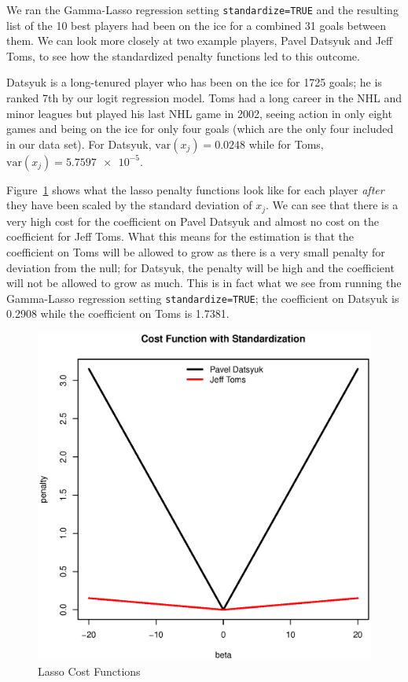 \documentclass[11pt, fleqn]{article}
\begin{document}
We ran the Gamma-Lasso regression setting \texttt{standardize=TRUE} and the resulting list of the 10 best players had been on the ice for a combined 31 goals between them. We can look more closely at two example players, Pavel Datsyuk and Jeff Toms, to see how the standardized penalty functions led to this outcome.

Datsyuk is a long-tenured player who has been on the ice for 1725 goals; he is ranked 7th by our logit regression model. Toms had a long career in the NHL and minor leagues but played his last NHL game in 2002, seeing action in only eight games and being on the ice for only four goals (which are the only four included in our data set). For Datsyuk, $\mathrm{var}(x_j)=0.0248$ while for Toms, $\mathrm{var}(x_j)=\num{5.7597e-5}$.

Figure~\ref{fig:cost_fcn} shows what the lasso penalty functions look like for each player \textit{after} they have been scaled by the standard deviation of $x_j$. We can see that there is a very high cost for the coefficient on Pavel Datsyuk and almost no cost on the coefficient for Jeff Toms. What this means for the estimation is that the coefficient on Toms will be allowed to grow as there is a very small penalty for deviation from the null; for Datsyuk, the penalty will be high and the coefficient will not be allowed to grow as much. This is in fact what we see from running the Gamma-Lasso regression setting \texttt{standardize=TRUE}; the coefficient on Datsyuk is 0.2908 while the coefficient on Toms is 1.7381.

\begin{figure}[!htb]
  \centering
  \includegraphics[scale=.5]{cost_fcn.eps}
  \caption{Lasso Cost Functions}
  \label{fig:cost_fcn}
\end{figure}
\end{document}
